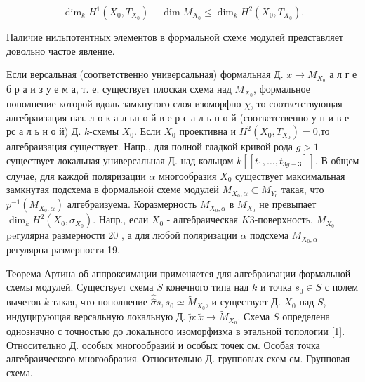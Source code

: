 \documentclass[10pt]{article}
\begin{document}
\[

\operatorname{dim}_{k} H^{1}\left(X_{0}, T_{X_{0}}\right)-\operatorname{dim} M_{X_{0}} \leqslant \operatorname{dim}_{k} H^{2}\left(X_{0}, T_{X_{0}}\right) .

\]



Наличие нильпотентных элементов в формальной схеме модулей представляет довольно частое явление.



Если версальная (соответственно универсальная) формальная Д. $x \rightarrow M_{X_{0}}$ а л г е б р а и з у е м а, т. е. существует плоская схема над $M_{X_{0}}$, формальное пополнение которой вдоль замкнутого слоя изоморфно $\chi$, то соответствующая алгебраизация наз. л о к а л ьн о й в е р с а л ь н о й (соответственно у н и в е рс а л ь н о й) Д. $k$-схемы $X_{0}$. Если $X_{0}$ проективна и $H^{2}\left(X_{0}, T_{X_{0}}\right)=0$,то алгебраизация существует. Напр., для полной гладкой кривой рода $g>1$ существует локальная универсальная Д. над кольцом $k\left[\left[t_{1}, \ldots, t_{3 g-3}\right]\right]$. В общем случае, для каждой поляризации $\alpha$ многообразия $X_{0}$ существует максимальная замкнутая подсхема в формальной схеме модулей $M_{X_{0}, \alpha} \subset M_{Y_{0}}$ такая, что $p^{-1}\left(M_{X_{0}, \alpha}\right)$ алгебраизуема. Коразмерность $M_{X_{0}, \alpha}$ в $M_{X_{0}}$ не превыпает $\operatorname{dim}_{k} H^{2}\left(X_{0}, \sigma_{X_{0}}\right)$. Напр., если $X_{0}$ - алгебраическая $K 3$-поверхность, $M_{X_{0}}$ peгулярна размерности 20 , а для любой поляризации $\alpha$ подсхема $M_{X_{0}, \alpha}$ регулярна размерности 19.



Теорема Артина об аппроксимации применяется для алгебраизации формальной схемы модулей. Существует схема $S$ конечного типа над $k$ и точка $s_{0} \in S$ с полем вычетов $k$ такая, что пополнение $\widehat{\hat{\sigma}} s, s_{0} \simeq \widetilde{M}_{X_{0}}$, и существует Д. $X_{0}$ над $S$, индуцирующая версальную локальную Д. $\tilde{p}: \tilde{x} \rightarrow \tilde{M}_{X_{0}}$. Схема $S$ определена однозначно с точностью до локального изоморфизма в этальной топологии [1]. Относительно Д. особых многообразий и особых точек см. Особая точка алгебраического многообразия. Относительно Д. групповых схем см. Групповая схема.
\end{document}
